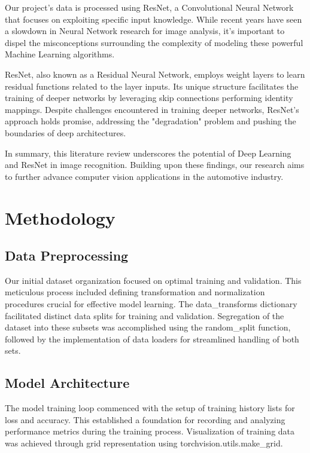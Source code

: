 \documentclass{article}
\begin{document}
Our project's data is processed using ResNet, a Convolutional Neural Network that focuses on exploiting specific input knowledge. While recent years have seen a slowdown in Neural Network research for image analysis, it's important to dispel the misconceptions surrounding the complexity of modeling these powerful Machine Learning algorithms.

ResNet, also known as a Residual Neural Network, employs weight layers to learn residual functions related to the layer inputs. Its unique structure facilitates the training of deeper networks by leveraging skip connections performing identity mappings. Despite challenges encountered in training deeper networks, ResNet's approach holds promise, addressing the "degradation" problem and pushing the boundaries of deep architectures.

In summary, this literature review underscores the potential of Deep Learning and ResNet in image recognition. Building upon these findings, our research aims to further advance computer vision applications in the automotive industry.

\section{Methodology}
\subsection{Data Preprocessing}

Our initial dataset organization focused on optimal training and validation. This meticulous process included defining transformation and normalization procedures crucial for effective model learning. The data\_transforms dictionary facilitated distinct data splits for training and validation. Segregation of the dataset into these subsets was accomplished using the random\_split function, followed by the implementation of data loaders for streamlined handling of both sets.

\subsection{Model Architecture}

The model training loop commenced with the setup of training history lists for loss and accuracy. This established a foundation for recording and analyzing performance metrics during the training process. Visualization of training data was achieved through grid representation using torchvision.utils.make\_grid.
\end{document}
